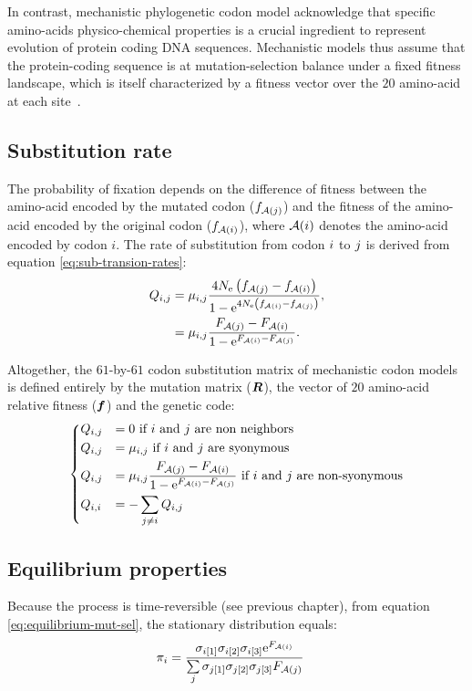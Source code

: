 In contrast, mechanistic phylogenetic codon model acknowledge that specific amino-acids physico-chemical properties is a crucial ingredient to represent evolution of protein coding \acrshort{DNA} sequences.
Mechanistic models thus assume that the protein-coding sequence is at mutation-selection balance under a fixed fitness landscape, which is itself characterized by a fitness vector over the $20$ amino-acid at each site~\citep{Halpern1998, Yang2008, Rodrigue2010}.

\subsection{Substitution rate}
The probability of fixation depends on the difference of fitness between the amino-acid encoded by the mutated \gls{codon} ($f_{\mathcal{A}({j})}$) and the fitness of the amino-acid encoded by the original \gls{codon} ($f_{\mathcal{A}({i})}$), where $\mathcal{A}({i})$ denotes the amino-acid encoded by \gls{codon} $i$.
The rate of \gls{substitution} from \gls{codon} ${i}$ to ${j}$ is derived from equation \ref{eq:sub-transion-rates}:
\begin{align}
    Q_{{i}, {j}} & = \mu_{{i}, {j}} \dfrac{4 N_{\textrm{e}} \left({f_{\mathcal{A}({j})} - f_{\mathcal{A}({i})}}\right)}{{1 - \mathrm{e}^{4 N_{\textrm{e}} \left({f_{\mathcal{A}({i})} - f_{\mathcal{A}({j})}}\right)} }}, \\
    & = \mu_{{i}, {j}} \dfrac{F_{\mathcal{A}({j})} - F_{\mathcal{A}({i})}}{1 - \mathrm{e}^{F_{\mathcal{A}({i})} - F_{\mathcal{A}({j})}} }.
\end{align}

Altogether, the $61$-by-$61$ \gls{codon} \gls{substitution} matrix of mechanistic \gls{codon} models is defined entirely by the mutation matrix ($\bm{R}$), the vector of $20$ amino-acid relative fitness ($\bm{f}$) and the genetic code:
\begin{equation}
    \begin{dcases}
        Q_{{i}, {j}} & = 0 \text{ if ${i}$ and ${j}$ are non neighbors} \\
        Q_{{i}, {j}} & = \mu_{{i}, {j}} \text{ if ${i}$ and ${j}$ are syonymous} \\
        Q_{{i}, {j}} & = \mu_{{i}, {j}} \dfrac{F_{\mathcal{A}({j})} - F_{\mathcal{A}({i})}}{1 - \mathrm{e}^{F_{\mathcal{A}({i})} - F_{\mathcal{A}({j})}} } \text{ if ${i}$ and ${j}$ are non-syonymous} \\
        Q_{{i}, {i}} & = - \sum\limits_{{j} \neq {i}} Q_{{i}, {j}}
    \end{dcases}
    \label{eq:propensities-models}
\end{equation}

\subsection{Equilibrium properties}
Because the process is time-reversible (see previous chapter), from equation \ref{eq:equilibrium-mut-sel}, the stationary distribution equals:
\begin{align}
    \pi_{{i}} & = \dfrac{\sigma_{{i}[1]}\sigma_{{i}[2]}\sigma_{{i}[3]}\mathrm{e}^{F_{\mathcal{A}({i})}}}{\sum\limits_{{j}}\sigma_{{j}[1]}\sigma_{{j}[2]}\sigma_{{j}[3]}F_{\mathcal{A}({j})} }
\end{align}

